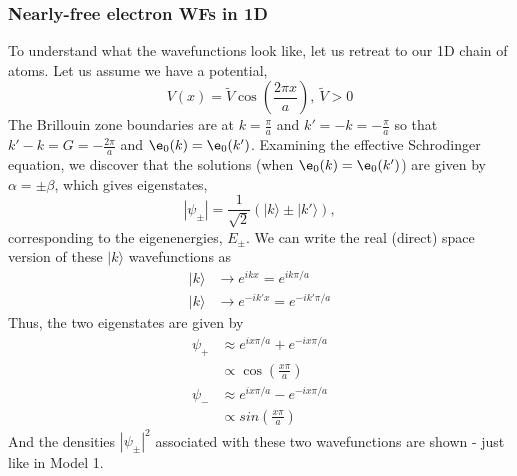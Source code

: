 \documentclass[a4paper, 11pt, normalem]{report}
\begin{document}
\section{Nearly-free electron WFs in 1D}
To understand what the wavefunctions look like, let us retreat to our 1D chain of atoms. 
Let us assume we have a potential, 
\begin{equation}
    V(x) = \tilde{V}\cos\left(\frac{2\pi x}{a}\right),~ \tilde{V} > 0
\end{equation}
The Brillouin zone boundaries are at $k = \frac{\pi}{a}$ and $k' = -k = -\frac{\pi}{a}$ so that $k' -k = G = -\frac{2\pi}{a}$ and $\e_0(k) = \e_0(k')$.
Examining the effective Schrodinger equation, we discover that the solutions (when $\e_0(k) = \e_0(k')$) are given by $\alpha = \pm \beta$, which gives eigenstates, 
\begin{equation}
    |\psi_{\pm}| = \frac{1}{\sqrt{2}}(|k\rangle \pm |k'\rangle),
\end{equation}
corresponding to the eigenenergies, $E_\pm$.
We can write the real (direct) space version of these $|k\rangle$ wavefunctions as 
\begin{align}
    |k\rangle &\to e^{ikx} = e^{ik\pi/a} \\
    |k\rangle &\to e^{-ik'x} = e^{-ik'\pi/a}
\end{align}
Thus, the two eigenstates are given by
\begin{align}
    \psi_+ &\approx e^{ix\pi/a} + e^{-ix\pi/a} \\
           &\propto \cos\left(\frac{x\pi}{a}\right) \\
    \psi_- &\approx e^{ix\pi/a} - e^{-ix\pi/a} \\
           &\propto sin\left(\frac{x\pi}{a}\right)
\end{align}
And the densities $|\psi_\pm|^2$ associated with these two wavefunctions are shown - just like in Model 1.











\part{}
\end{document}
